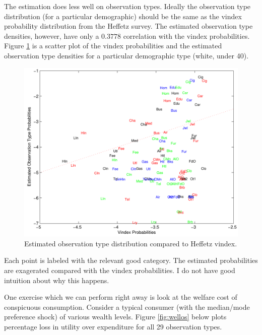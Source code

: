 \documentclass{article}
\begin{document}
The estimation does less well on observation types.
Ideally the observation type distribution (for a particular demographic) should be the same as the vindex probability distribution from the Heffetz survey.
The estimated observation type densities, however, have only a $0.3778$ correlation with the vindex probabilities.
Figure \ref{fig:vinmatch} is a scatter plot of the vindex probabilities and the estimated observation type densities for a particular demographic type (white, under 40).
\begin{figure}
	\begin{center}
		\includegraphics[scale=.8]{pics/vinmatch_cropped.pdf}
	\end{center}
	\caption{Estimated observation type distribution compared to Heffetz vindex.}
	\label{fig:vinmatch}
\end{figure}
Each point is labeled with the relevant good category.
The estimated probabilities are exagerated compared with the vindex probabilities.
I do not have good intuition about why this happens.

One exercise which we can perform right away is look at the welfare cost of conspicuous consumption.
Consider a typical consumer (with the median/mode preference shock) of various wealth levels.  
Figure \ref{fig:wellos} below plots percentage loss in utility over expenditure for all 29 observation types.
\end{document}

